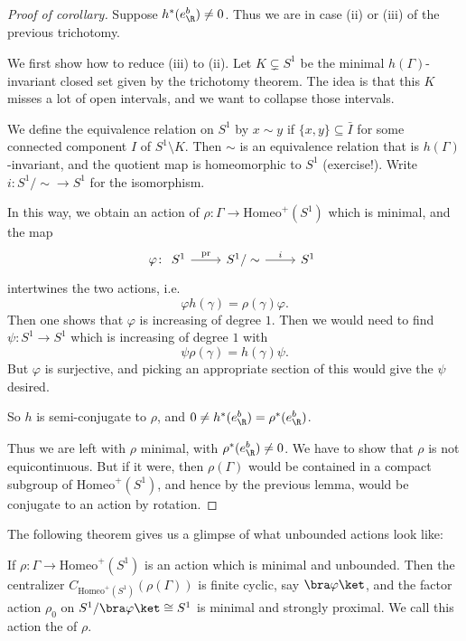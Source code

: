 \documentclass[a4paper]{article}
\newcommand\Homeo{\mathrm{Homeo}}
\begin{document}
\begin{proof}[Proof of corollary] %
  Suppose $h^*(e^b_\R) \not= 0$. Thus we are in case (ii) or (iii) of the previous trichotomy.

  We first show how to reduce (iii) to (ii). Let $K \subsetneq S^1$ be the minimal $h(\Gamma)$-invariant closed set given by the trichotomy theorem. The idea is that this $K$ misses a lot of open intervals, and we want to collapse those intervals.

  We define the equivalence relation on $S^1$ by $x \sim y$ if $\{x, y\} \subseteq \bar{I}$ for some connected component $I$ of $S^1 \setminus K$. Then $\sim$ is an equivalence relation that is $h(\Gamma)$-invariant, and the quotient map is homeomorphic to $S^1$ (exercise!). Write $i\colon S^1/\sim \to S^1$ for the isomorphism.

  In this way, we obtain an action of $\rho\colon \Gamma \to \Homeo^+(S^1)$ which is minimal, and the map
  \[
    \varphi\colon
    \begin{tikzcd}
      S^1 \ar[r, "\mathrm{pr}"] & S^1/\sim \ar[r, "i"] & S^1
    \end{tikzcd}
  \]
  intertwines the two actions, i.e.
  \[
    \varphi h(\gamma) = \rho(\gamma) \varphi.
  \]
  Then one shows that $\varphi$ is increasing of degree $1$. Then we would need to find $\psi\colon S^1 \to S^1$ which is increasing of degree $1$ with
  \[
    \psi \rho(\gamma) = h(\gamma) \psi.
  \]
  But $\varphi$ is surjective, and picking an appropriate section of this would give the $\psi$ desired.

  So $h$ is semi-conjugate to $\rho$, and $0 \not= h^*(e^b_\R) = \rho^*(e^b_\R)$.

  Thus we are left with $\rho$ minimal, with $\rho^*(e^b_\R) \not= 0$. We have to show that $\rho$ is not equicontinuous. But if it were, then $\rho(\Gamma)$ would be contained in a compact subgroup of $\Homeo^+(S^1)$, and hence by the previous lemma, would be conjugate to an action by rotation.
\end{proof}

The following theorem gives us a glimpse of what unbounded actions look like:
\begin{thm}
  If $\rho\colon \Gamma \to \Homeo^+(S^1)$ is an action which is minimal and unbounded. Then the centralizer $C_{\Homeo^+(S^1)}(\rho(\Gamma))$ is finite cyclic, say $\bra \varphi\ket$, and the factor action $\rho_0$ on $S^1/\bra \varphi\ket \cong S^1$ is minimal and strongly proximal. We call this action the  of $\rho$.
\end{thm}
\end{document}
